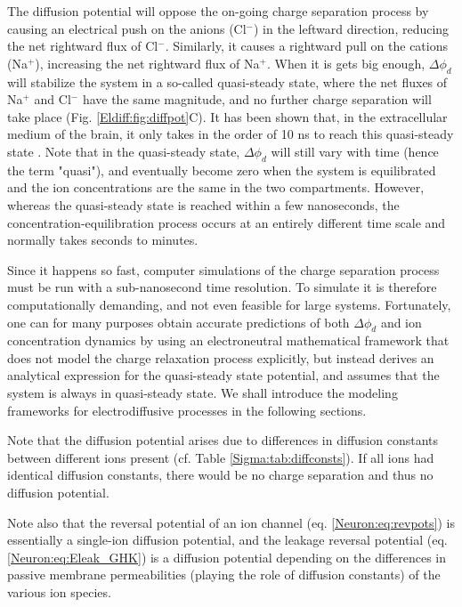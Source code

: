 The diffusion potential will oppose the on-going charge separation process by causing an electrical push on the anions (Cl$^-$) in the leftward direction, reducing the net rightward flux of Cl$^-$. Similarly, it causes a rightward pull on the cations (Na$^+$), increasing the net rightward flux of Na$^+$. When it is gets big enough, $\Delta \phi_d$ will stabilize the system in a so-called quasi-steady state, where the net fluxes of Na$^+$ and Cl$^-$ have the same magnitude, and no further charge separation will take place (Fig. \ref{Eldiff:fig:diffpot}C). It has been shown that, in the extracellular medium of the brain, it only takes in the order of 10 ns to reach this quasi-steady state \citep{Solbra2018}. Note that in the quasi-steady state, $\Delta \phi_d$ will still vary with time (hence the term "quasi"), and eventually become zero when the system is equilibrated and the ion concentrations are the same in the two compartments. However, whereas the quasi-steady state is reached within a few nanoseconds, the concentration-equilibration process occurs at an entirely different time scale and normally takes seconds to minutes.

Since it happens so fast, computer simulations of the charge separation process must be run with a sub-nanosecond time resolution. To simulate it is therefore computationally demanding, and not even feasible for large systems. Fortunately, one can for many purposes obtain accurate predictions of both $\Delta \phi_d$ and ion concentration dynamics by using an electroneutral mathematical framework that does not model the charge relaxation process explicitly, but instead derives an analytical expression for the quasi-steady state potential, and assumes that the system is always in quasi-steady state. We shall introduce the modeling frameworks for electrodiffusive processes in the following sections. 

Note that the diffusion potential arises due to differences in diffusion constants between different ions present  (cf. Table \ref{Sigma:tab:diffconsts}). If all ions had identical diffusion constants, there would be no charge separation and thus no diffusion potential. 

Note also that the reversal potential of an ion channel (eq. \ref{Neuron:eq:revpots}) is essentially a single-ion diffusion potential, and the leakage reversal potential (eq. \ref{Neuron:eq:Eleak_GHK}) is a diffusion potential depending on the differences in passive membrane permeabilities (playing the role of diffusion constants) of the various ion species.

